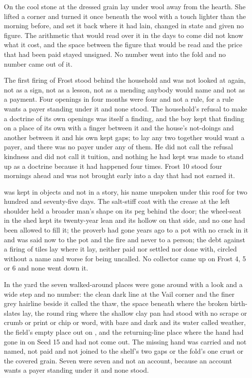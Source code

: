 On the cool stone at  the dressed grain lay under wool away from the hearth. She lifted a corner and turned it once beneath the wool with a touch lighter than the morning before, and set it back where it had lain, changed in state and given no figure. The arithmetic that would read over it in the days to come did not know what it cost, and the space between the figure that would be read and the price that had been paid stayed unsigned. No number went into the fold and no number came out of it.

The first firing of Frost stood behind the household and was not looked at again, not as a sign, not as a lesson, not as a mending anybody would name and not as a payment. Four openings in four months were four and not a rule, for a rule wants a payer standing under it and none stood. The household's refusal to make a doctrine of its own openings was itself a finding, and the boy kept that finding on a place of its own with a finger between it and the house's not-doings and another between it and his own kept gaps; to lay any two together would want a payer, and there was no payer under any of them. He did not call the refusal kindness and did not call it tuition, and nothing he had kept was made to stand up as a doctrine because it had happened four times. Frost 10 stood four mornings ahead and was not brought early into a day that had not earned it.

 was kept in objects and not in a story, his name unspoken under this roof for two hundred and seventy-five days. The salt-stiff coat with the crease at the left shoulder held a broader man's shape on its peg behind the door; the wheel-seat in the shed kept its twenty-year lean and its hollow on that side, and no one had been allowed to fill it; the proverb had gone years ago to a pot with no crack in it and was said now to the pot and the fire and never to a person; the debt against a firing of tiles lay where it lay, neither paid nor settled nor done with, circled without a name and worse for being uncalled. No collector came up  on Frost 4, 5 or 6 and none went down it.

In the yard the seven walked-around places were gone around with a look and a wide step and no number: the clean dark line at the Vail corner and the finer grey hairline beside it called the thaw, the space beneath  where the broken birth-slates lay, the round ring where the shallow clay pan had stood with no scrape or crumb or print or chip or word,  with  bare and dark and its water called weather, the field's empty place out on , and the returning-line place where the hand had gone in on Seed 15 and had not come out. The missing hand was carried and not named, not paid and not joined to the shelf's two gaps or the fold's one crust or the covered grain. Seven were seven and not an account, because an account wants a payer standing under it and none stood.

